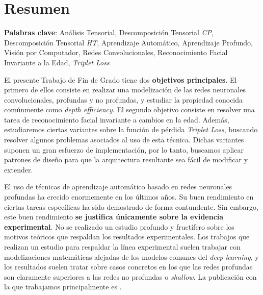 %



\chapter{Resumen}


\textbf{Palabras clave}: Análisis Tensorial, Descomposición Tensorial \textit{CP}, Descomposición Tensorial \textit{HT}, Aprendizaje Automático, Aprendizaje Profundo, Visión por Computador, Redes Convolucionales, Reconocimiento Facial Invariante a la Edad, \textit{Triplet Loss}

El presente Trabajo de Fin de Grado tiene dos \textbf{objetivos principales}. El primero de ellos consiste en realizar una modelización de las redes neuronales convolucionales, profundas y no profundas, y estudiar la propiedad conocida comúnmente como \textit{depth efficiency}. El segundo objetivo consiste en resolver una tarea de reconocimiento facial invariante a cambios en la edad. Además, estudiaremos ciertas variantes sobre la función de pérdida \textit{Triplet Loss}, buscando resolver algunos problemas asociados al uso de esta técnica. Dichas variantes suponen un gran esfuerzo de implementación, por lo tanto, buscamos aplicar patrones de diseño para que la arquitectura resultante sea fácil de modificar y extender.

El uso de técnicas de aprendizaje automático basado en redes neuronales profundas ha crecido enormemente en los últimos años. Su buen rendimiento en ciertas tareas específicas ha sido demostrado de forma contundente. Sin embargo, este buen rendimiento \textbf{se justifica únicamente sobre la evidencia experimental}. No se realizado un estudio profundo y fructífero sobre los motivos teóricos que respaldan los resultados experimentales. Los trabajos que realizan un estudio para respaldar la línea experimental suelen trabajar con modelizaciones matemáticas alejadas de los modelos comunes del \textit{deep learning}, y los resultados suelen tratar sobre casos concretos en los que las redes profundas son claramente superiores a las redes no profundas o \textit{shallow}. La publicación con la que trabajamos principalmente es \cite{matematicas:principal}.

